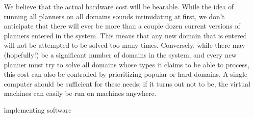 We believe that the actual hardware cost will be bearable.  While the
idea of running all planners on all domains sounds intimidating at
first, we don't anticipate that there will ever be more than a couple
dozen current versions of planners entered in the system.  This means
that any new domain that is entered will not be attempted to be solved
too many times.  Conversely, while there may (hopefully!) be a
significant number of domains in the system, and every new planner
must try to solve all domains whose types it claims to be able to
process, this cost can also be controlled by prioritizing popular or
hard domains.  A single computer should be sufficient for these needs;
if it turns out not to be, the virtual machines can easily be run on
machines anywhere.

implementing software






